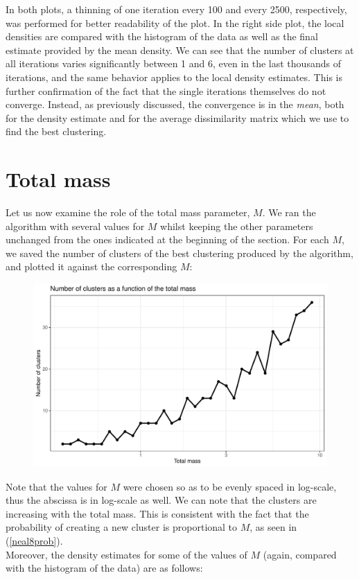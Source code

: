 In both plots, a thinning of one iteration every 100 and every 2500, respectively, was performed for better readability of the plot.
In the right side plot, the local densities are compared with the histogram of the data as well as the final estimate provided by the mean density.
We can see that the number of clusters at all iterations varies significantly between 1 and 6, even in the last thousands of iterations, and the same behavior applies to the local density estimates. 
This is further confirmation of the fact that the single iterations themselves do not converge.
Instead, as previously discussed, the convergence is in the \emph{mean}, both for the density estimate and for the average dissimilarity matrix which we use to find the best clustering.

\section{Total mass}
Let us now examine the role of the total mass parameter, $M$.
We ran the algorithm with several values for $M$ whilst keeping the other parameters unchanged from the ones indicated at the beginning of the section.
For each $M$, we saved the number of clusters of the best clustering produced by the algorithm, and plotted it against the corresponding $M$:

\begin{figure}[h]
	\centering
	\includegraphics[scale=0.6]{etc/num_clust_M.pdf}
\end{figure}

Note that the values for $M$ were chosen so as to be evenly spaced in log-scale, thus the abscissa is in log-scale as well.
We can note that the clusters are increasing with the total mass.
This is consistent with the fact that the probability of creating a new cluster is proportional to $M$, as seen in (\ref{neal8prob}). \\
Moreover, the density estimates for some of the values of $M$ (again, compared with the histogram of the data) are as follows:

